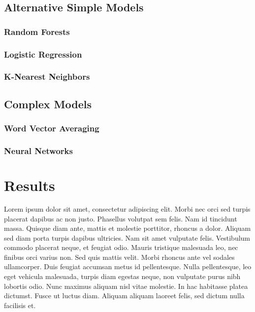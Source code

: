 \documentclass[conference]{IEEEtran}
\begin{document}

\subsection{Alternative Simple Models}


\subsubsection{Random Forests}


\subsubsection{Logistic Regression}


\subsubsection{K-Nearest Neighbors}


\subsection{Complex Models}


\subsubsection{Word Vector Averaging}


\subsubsection{Neural Networks}

\section{Results}

Lorem ipsum dolor sit amet, consectetur adipiscing elit. Morbi nec orci sed turpis placerat dapibus ac non justo. Phasellus volutpat sem felis. Nam id tincidunt massa. Quisque diam ante, mattis et molestie porttitor, rhoncus a dolor. Aliquam sed diam porta turpis dapibus ultricies. Nam sit amet vulputate felis. Vestibulum commodo placerat neque, et feugiat odio. Mauris tristique malesuada leo, nec finibus orci varius non. Sed quis mattis velit. Morbi rhoncus ante vel sodales ullamcorper. Duis feugiat accumsan metus id pellentesque. Nulla pellentesque, leo eget vehicula malesuada, turpis diam egestas neque, non vulputate purus nibh lobortis odio. Nunc maximus aliquam nisl vitae molestie. In hac habitasse platea dictumst. Fusce ut luctus diam. Aliquam aliquam laoreet felis, sed dictum nulla facilisis et.
\end{document}
